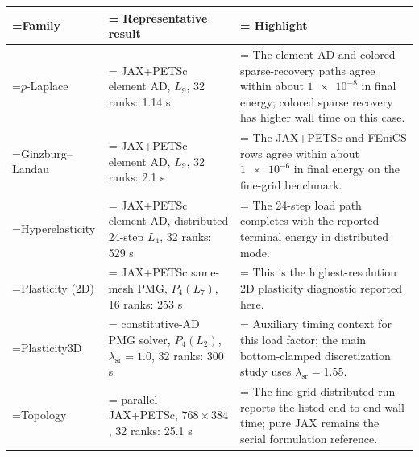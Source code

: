 \begin{tabularx}{\textwidth}{@{}>{\hsize=0.471\hsize\linewidth=\hsize\RaggedRight\arraybackslash}X>{\hsize=1.074\hsize\linewidth=\hsize\RaggedRight\arraybackslash}X>{\hsize=1.455\hsize\linewidth=\hsize\RaggedRight\arraybackslash}X@{}}
\toprule
Family & Representative result & Highlight \\
\midrule
$p$-Laplace & JAX+PETSc element AD, $L_{9}$, 32 ranks: \num{1.14} s & The element-AD and colored sparse-recovery paths agree within about $\num{1e-8}$ in final energy; colored sparse recovery has higher wall time on this case. \\
Ginzburg--Landau & JAX+PETSc element AD, $L_{9}$, 32 ranks: \num{2.1} s & The JAX+PETSc and FEniCS rows agree within about $\num{1e-6}$ in final energy on the fine-grid benchmark. \\
Hyperelasticity & JAX+PETSc element AD, distributed 24-step $L_{4}$, 32 ranks: \num{529} s & The 24-step load path completes with the reported terminal energy in distributed mode. \\
Plasticity (2D) & JAX+PETSc same-mesh PMG, $P_{4}(L_{7})$, 16 ranks: \num{253} s & This is the highest-resolution 2D plasticity diagnostic reported here. \\
Plasticity3D & constitutive-AD PMG solver, $P_{4}(L_{2})$, $\lambda_{\mathrm{sr}}=\num{1.0}$, 32 ranks: \num{300} s & Auxiliary timing context for this load factor; the main bottom-clamped discretization study uses $\lambda_{\mathrm{sr}}=\num{1.55}$. \\
Topology & parallel JAX+PETSc, $768\times384$, 32 ranks: \num{25.1} s & The fine-grid distributed run reports the listed end-to-end wall time; pure JAX remains the serial formulation reference. \\
\bottomrule
\end{tabularx}
